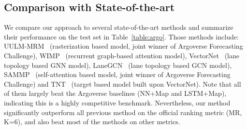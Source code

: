 \subsection{Comparison with State-of-the-art}
We compare our approach to several state-of-the-art methods and summarize
their performance on the test set in Table~\ref{table:argo}. Those methods
include: UULM-MRM~\cite{argoleaderboard} (rasterization based model, joint winner
of Argoverse Forecasting Challenge), WIMP~\cite{wimp} (recurrent graph-based
attention model), VectorNet~\cite{vectornet} (lane topology based GNN model),
LaneGCN~\cite{lgn} (lane topology based GCN model),
SAMMP~\cite{mercat2020multi} (self-attention based model, joint winner of
Argoverse Forecasting Challenge) and TNT~\cite{tnt} (target based model built
upon VectorNet). Note that all of them largely beat the Argoverse baselines
(NN+Map and LSTM+Map), indicating this is a highly competitive benchmark.
Nevertheless, our method significantly outperform all previous method on the
official ranking metric (MR, K=6), and also beat most of the methods on other
metrics. 


